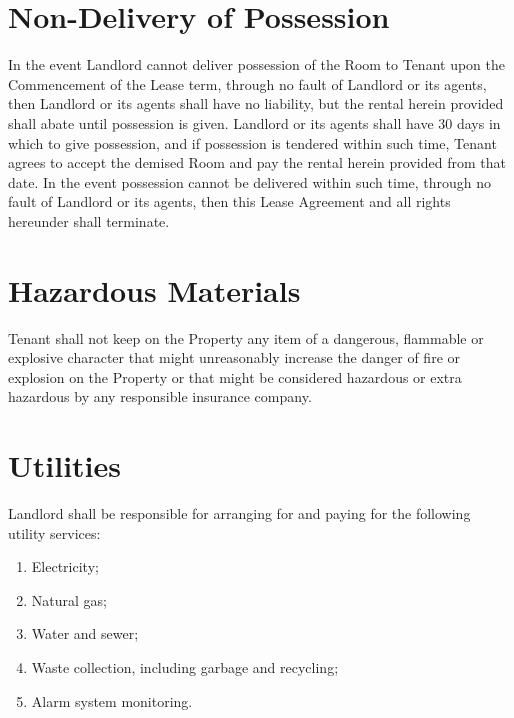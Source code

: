 \documentclass{amsart}
\begin{document}
\section{Non-Delivery of Possession}
In the event Landlord cannot deliver possession of the Room to Tenant upon the
Commencement of the Lease term, through no fault of Landlord or its agents, then
Landlord or its agents shall have no liability, but the rental herein provided
shall abate until possession is given. Landlord or its agents shall have 30 days
in which to give possession, and if possession is tendered within such time,
Tenant agrees to accept the demised Room and pay the rental herein provided from
that date. In the event possession cannot be delivered within such time, through
no fault of Landlord or its agents, then this Lease Agreement and all rights
hereunder shall terminate.
\section{Hazardous Materials}
Tenant shall not keep on the Property any item of a dangerous, flammable or
explosive character that might unreasonably increase the danger of fire or
explosion on the Property or that might be considered hazardous or extra
hazardous by any responsible insurance company.
\section{Utilities}
Landlord shall be responsible for arranging for and paying for the following
utility services:
\begin{enumerate}
    \item Electricity;
    \item Natural gas;
    \item Water and sewer;
    \item Waste collection, including garbage and recycling;
    \item Alarm system monitoring.
\end{enumerate}
\end{document}
